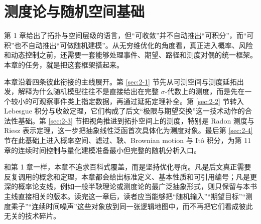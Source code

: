 \chapter{测度论与随机空间基础}

\label{chap:02}

第 1 章给出了拓扑与空间层级的语言，但“可收敛”并不自动推出“可积分”，而“可积”也不自动推出“可做随机建模”。从无穷维优化的角度看，真正进入概率、风险和动态控制之前，还需要一套能够处理事件、期望、路径和测度对偶的统一框架。本章的任务，就是把这套框架搭起来。

本章沿着四条彼此衔接的主线展开。第 \ref{sec:2-1} 节先从可测空间与测度延拓出发，解释为什么随机模型往往不是直接给出在完整 $\sigma$-代数上的测度，而是先在一个较小的可观察事件类上指定数据，再通过延拓定理补全。第 \ref{sec:2-2} 节转入 Lebesgue 积分与收敛定理，它们构成了后文“极限与期望交换”这一技术动作的合法性基础。第 \ref{sec:2-3} 节把视角推进到拓扑空间上的测度，特别是 Radon 测度与 Riesz 表示定理，这一步把抽象线性泛函首次具体化为测度对象。最后第 \ref{sec:2-4} 节在此基础上进入概率空间、滤过、鞅、Brownian motion 与 Itô 积分，为第 11 章的连续时间控制与量化建模准备最小但完整的随机分析入口。

和第 1 章一样，本章不追求百科式覆盖，而是坚持优化导向。凡是后文真正需要反复调用的概念和定理，本章都会给出标准定义、基本性质和可引用编号；凡是更深的概率论支线，例如一般半鞅理论或测度论的最广泛抽象形式，则只保留与本书主线直接相关的版本。读完这一章后，读者应当能够把“随机输入”“期望目标”“测度乘子”“连续时间噪声”这些对象放到同一张逻辑地图中，而不再把它们看成彼此无关的技术碎片。








